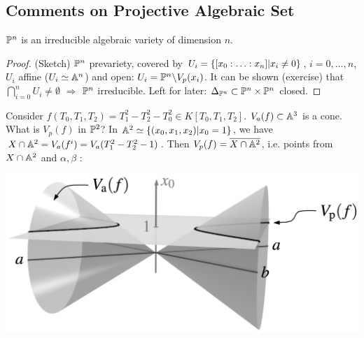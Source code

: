 \documentclass[a4paper,11pt]{article}
\begin{document}
			{\color{gray}\subsection*{Comments on Projective Algebraic Set}
			
				\begin{prop}
					$\P^n$ is an irreducible algebraic variety of dimension $n$.
				\end{prop}
				\begin{proof}\renewcommand{\qedsymbol}{}
					(Sketch) $\P^n$ prevariety, covered by $U_i=\{\x{n}|x_i\neq0\}$, $i=0,\dots,n$, $U_i$ affine ($U_i\simeq\AA^n$) and open: $U_i=\P^n\backslash V_p(x_i)$. It can be shown (exercise) that $\bigcap_{i=0}^nU_i\neq\emptyset$ $\Longrightarrow$ $\P^n$ irreducible. Left for later: $\Delta_{\P^n}\subset\P^n\times\P^n$ closed.
				\end{proof}\renewcommand{\qedsymbol}{$\square$}

				\begin{eg}
					Consider $f(T_0,T_1,T_2)=T_1^2-T_2^2-T_0^2\in K[T_0,T_1,T_2]$. $V_a(f)\subset\AA^3$ is a cone. What is $V_p(f)$ in $\P^2$? In $\AA^2\simeq\{(x_0,x_1,x_2)|x_0=1\}$, we have $X\cap\AA^2=V_a(f^i)=V_a(T_1^2-T_2^2-1)$. Then $V_p(f)=\overline{X\cap\AA^2}$, i.e. points from $X\cap\AA^2$ and $\alpha,\beta$ :
					\begin{center}
						\includegraphics[width=.6\textwidth]{cone.pdf}
					\end{center}
				\end{eg}

}
\end{document}
